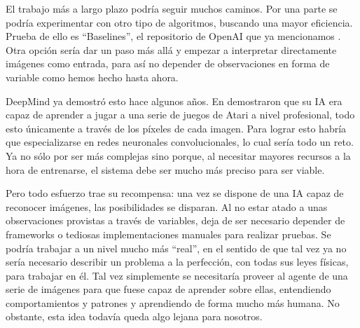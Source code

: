 El trabajo más a largo plazo podría seguir muchos caminos. Por una parte se podría experimentar con otro tipo de algoritmos, buscando una mayor eficiencia. Prueba de ello es ``Baselines'', el repositorio de OpenAI que ya mencionamos \citep{baselines}. Otra opción sería dar un paso más allá y empezar a interpretar directamente imágenes como entrada, para así no depender de observaciones en forma de variable como hemos hecho hasta ahora.

DeepMind ya demostró esto hace algunos años. En \citet{mnih2013playing} demostraron que su IA era capaz de aprender a jugar a una serie de juegos de Atari a nivel profesional, todo esto únicamente a través de los píxeles de cada imagen. Para lograr esto habría que especializarse en redes neuronales convolucionales, lo cual sería todo un reto. Ya no sólo por ser más complejas sino porque, al necesitar mayores recursos a la hora de entrenarse, el sistema debe ser mucho más preciso para ser viable.

Pero todo esfuerzo trae su recompensa: una vez se dispone de una IA capaz de reconocer imágenes, las posibilidades se disparan. Al no estar atado a unas observaciones provistas a través de variables, deja de ser necesario depender de frameworks o tediosas implementaciones manuales para realizar pruebas. Se podría trabajar a un nivel mucho más ``real'', en el sentido de que tal vez ya no sería necesario describir un problema a la perfección, con todas sus leyes físicas, para trabajar en él. Tal vez simplemente se necesitaría proveer al agente de una serie de imágenes para que fuese capaz de aprender sobre ellas, entendiendo comportamientos y patrones y aprendiendo de forma mucho más humana. No obstante, esta idea todavía queda algo lejana para nosotros.
